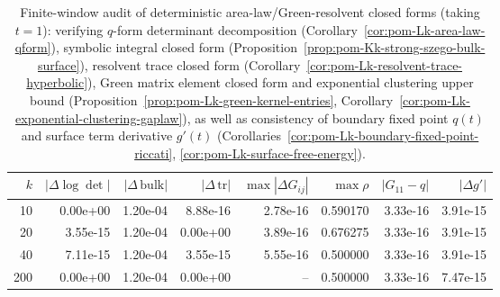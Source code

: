 \begin{table}[H]
\centering
\scriptsize
\setlength{\tabcolsep}{6pt}
\caption{Finite-window audit of deterministic area-law/Green-resolvent closed forms (taking $t=1$): verifying $q$-form determinant decomposition (Corollary~\ref{cor:pom-Lk-area-law-qform}), symbolic integral closed form (Proposition~\ref{prop:pom-Kk-strong-szego-bulk-surface}), resolvent trace closed form (Corollary~\ref{cor:pom-Lk-resolvent-trace-hyperbolic}), Green matrix element closed form and exponential clustering upper bound (Proposition~\ref{prop:pom-Lk-green-kernel-entries}, Corollary~\ref{cor:pom-Lk-exponential-clustering-gaplaw}), as well as consistency of boundary fixed point $q(t)$ and surface term derivative $g'(t)$ (Corollaries~\ref{cor:pom-Lk-boundary-fixed-point-riccati}, \ref{cor:pom-Lk-surface-free-energy}).}
\label{tab:fence_green_kernel_area_law_resolvent_audit}
\begin{tabular}{r r r r r r r r}
\toprule
$k$ & $|\Delta\log\det|$ & $|\Delta\,\mathrm{bulk}|$ & $|\Delta\,\mathrm{tr}|$ & $\max|\Delta G_{ij}|$ & $\max\rho$ & $|G_{11}-q|$ & $|\Delta g'|$\\
\midrule
10 & 0.00e+00 & 1.20e-04 & 8.88e-16 & 2.78e-16 & 0.590170 & 3.33e-16 & 3.91e-15\\
20 & 3.55e-15 & 1.20e-04 & 0.00e+00 & 3.89e-16 & 0.676275 & 3.33e-16 & 3.91e-15\\
40 & 7.11e-15 & 1.20e-04 & 3.55e-15 & 5.55e-16 & 0.500000 & 3.33e-16 & 3.91e-15\\
200 & 0.00e+00 & 1.20e-04 & 0.00e+00 & -- & 0.500000 & 3.33e-16 & 7.47e-15\\
\bottomrule
\end{tabular}
\end{table}
